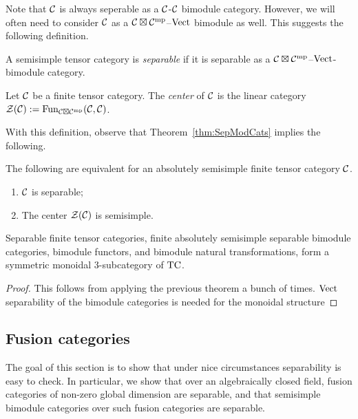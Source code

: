 \documentclass{amsart}
\begin{document}
Note that $\mathcal C$ is always seperable as a $\mathcal C$-$\mathcal C$ bimodule category.  However, we will often need to consider $\mathcal C$ as a $\mathcal C \boxtimes \mathcal C^{\mathrm{mp}}$--$\mathrm{Vect}$ bimodule as well.  This suggests the following definition.

\begin{definition}
	A semisimple tensor category is {\em separable} if it is separable as a $\mathcal C \boxtimes \mathcal C^{\mathrm{mp}}$--$\mathrm{Vect}$-bimodule category.  
\end{definition}


\begin{definition}
	Let $\mathcal C$ be a finite tensor category. The {\em center} of $\mathcal C$ is the linear category $\mathcal Z(\mathcal C) := \operatorname{Fun}_{\mathcal C \boxtimes \mathcal C^{\mathrm{mp}}}(\mathcal C, \mathcal C)$.
\end{definition}

With this definition, observe that Theorem~\ref{thm:SepModCats} implies the following.

\begin{corollary}
	The following are equivalent for an absolutely semisimple finite tensor category $\mathcal C$.
	\begin{enumerate}
		\item $\mathcal C$ is separable;
		\item The center $\mathcal Z(\mathcal C)$ is semisimple.
	\end{enumerate} 
\end{corollary}

\begin{theorem}
Separable finite tensor categories, finite absolutely semisimple separable bimodule categories, bimodule functors, and bimodule natural transformations, form a symmetric monoidal $3$-subcategory of $\mathrm{TC}$.
\end{theorem}
\begin{proof}
This follows from applying the previous theorem a bunch of times.  $\mathrm{Vect}$ separability of the bimodule categories is needed for the monoidal structure
\end{proof}


\subsection{Fusion categories} \label{sec:tc-fusion}

The goal of this section is to show that under nice circumstances separability is easy to check.  In particular, we show that over an algebraically closed field, fusion categories of non-zero global dimension are separable, and that semisimple bimodule categories over such fusion categories are separable.
\end{document}
